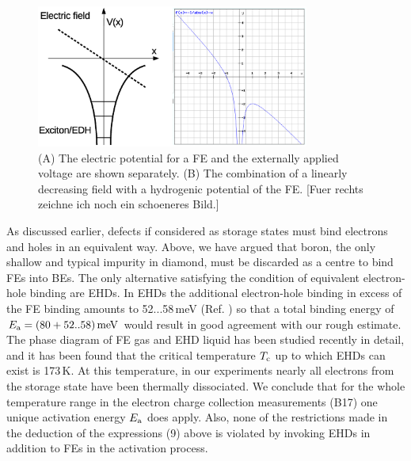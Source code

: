 \begin{figure}[tb]
 \centering
 \includegraphics[trim=0 170 0 0, width=0.8\textwidth]{figures/ExcField.eps}
 \caption{(A) The electric potential for a FE and the externally applied voltage are shown separately. (B) The combination of a linearly decreasing field with a hydrogenic potential of the FE. 
 [Fuer rechts zeichne ich noch ein schoeneres Bild.]}
 \label{fig:excfield}
\end{figure} 

As discussed earlier, defects if considered as storage states must bind electrons and holes in an equivalent way. 
Above, we have argued that boron, the only shallow and typical impurity in diamond, must be discarded as a centre to bind FEs into BEs. 
The only alternative satisfying the condition of equivalent electron-hole binding are EHDs. 
In EHDs the additional electron-hole binding in excess of the FE binding amounts to 52...58\,meV (Ref.     ) so that a total binding energy of
 $\Ea = (80 + 52..58)\,\si{\milli\eV}$ would result in good agreement with our rough estimate. 
The phase diagram of FE gas and EHD liquid has been studied recently in detail, and it has been found that the critical temperature $T_{\textrm{c}}$ up to which EHDs can exist is 173\,K. 
At this temperature, in our experiments nearly all electrons from the storage state have been thermally dissociated. 
We conclude that for the whole temperature range in the electron charge collection measurements {\color{red}(B17)} one unique activation energy $E_{\textrm{a}}$ does apply. 
Also, none of the restrictions made in the deduction of the expressions (9) above is violated by invoking EHDs in addition to FEs  in the activation process.

